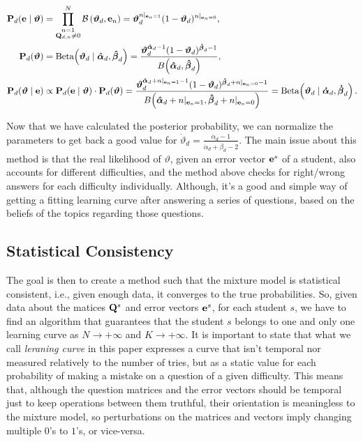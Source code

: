 \documentclass{article}
\newcommand{\0}{\mathbbold{0}}
\newcommand{\1}{\mathds{1}}
\newcommand{\2}{\mathbbold{2}}
\newcommand{\Beta}[2]{\text{Beta}\!\left(#1,#2\right)}
\begin{document}
\begin{align*}
    {\bf P}_d({\bf e} \mid \boldsymbol{\vartheta}) &= \prod_{\substack{n=1 \\ {\bf Q}_{d, n} \ne 0}}^N \mathcal{B}\left(\boldsymbol{\vartheta}_d, {\bf e}_n \right) = \boldsymbol{\vartheta}_d^{n|_{{\bf e}_n = 1}}(1 - \boldsymbol{\vartheta}_d)^{n|_{{\bf e}_n = 0}}, \\
    {\bf P}_d(\boldsymbol{\vartheta}) &= \Beta{\boldsymbol{\vartheta}_d \mid \boldsymbol{\hat{\alpha}}_d}{\boldsymbol{\hat{\beta}}_d} = \frac{\boldsymbol{\vartheta}_d^{\boldsymbol{\hat{\alpha}}_d - 1}(1 - \boldsymbol{\vartheta}_d)^{\boldsymbol{\hat{\beta}}_d - 1}}{B\!\left(\boldsymbol{\hat{\alpha}}_d,\boldsymbol{\hat{\beta}}_d\right)}, \\
    {\bf P}_d(\boldsymbol{\vartheta} \mid {\bf e}) &\propto {\bf P}_d({\bf e} \mid \boldsymbol{\vartheta}) \cdot {\bf P}_d(\boldsymbol{\vartheta}) = \frac{\boldsymbol{\vartheta}_d^{\boldsymbol{\hat{\alpha}}_d + n|_{{\bf e}_n = 1} - 1}(1 - \boldsymbol{\vartheta}_d)^{\boldsymbol{\hat{\beta}}_d + n|_{{\bf e}_n = 0} - 1}}{B\!\left(\boldsymbol{\hat{\alpha}}_d + n|_{{\bf e}_n = 1},\boldsymbol{\hat{\beta}}_d + n|_{{\bf e}_n = 0}\right)} = \Beta{\boldsymbol{\vartheta}_d \mid \boldsymbol{\dot{\alpha}}_d}{\boldsymbol{\dot{\beta}}_d}.
\end{align*}

Now that we have calculated the posterior probability, we can normalize the parameters to get back a good value for $\dot{\vartheta}_d = \frac{\dot{\alpha}_d - 1}{\dot{\alpha}_d+\dot{\beta}_d - 2}$.
The main issue about this method is that the real likelihood of $\vartheta$, given an error vector ${\bf e}^s$ of a student, also accounts for different difficulties, and the method above checks for right/wrong answers for each difficulty individually.
Although, it's a good and simple way of getting a fitting learning curve after answering a series of questions, based on the beliefs of the topics regarding those questions.

\subsection{Statistical Consistency}
The goal is then to create a method such that the mixture model is statistical consistent, i.e., given enough data, it converges to the true probabilities.
So, given data about the matices ${\bf Q}^s$ and error vectors ${\bf e}^s$, for each student $s$, we have to find an algorithm that guarantees that the student $s$ belongs to one and only one learning curve as $N \rightarrow +\infty$ and $K \rightarrow +\infty$.
It is important to state that what we call \textsl{leraning curve} in this paper expresses a curve that isn't temporal nor measured relatively to the number of tries, but as a static value for each probability of making a mistake on a question of a given difficulty.
This means that, although the question matrices and the error vectors should be temporal just to keep operations between them truthful, their orientation is meaningless to the mixture model, so perturbations on the matrices and vectors imply changing multiple $0$'s to $1$'s, or vice-versa.
\end{document}
